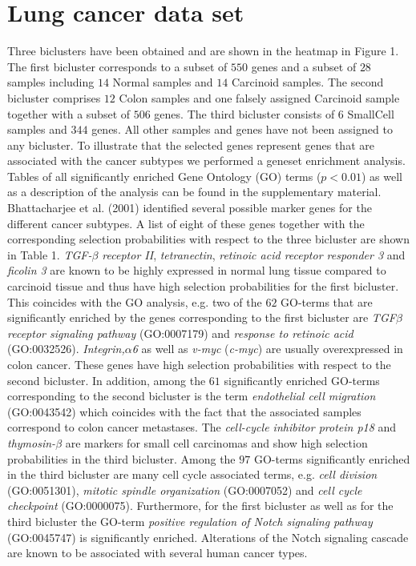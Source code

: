 \section{Lung cancer data set}
Three biclusters have been obtained and are shown in the heatmap in Figure 1. The first bicluster corresponds to a subset of $550$ genes and a subset of $28$ samples including $14$ Normal samples and $14$ Carcinoid samples. The second bicluster comprises $12$ Colon samples and one falsely assigned Carcinoid sample together with a subset of $506$ genes. The third bicluster consists of $6$ SmallCell samples and $344$ genes. All other samples and genes have not been assigned to any bicluster. To illustrate that the selected genes represent genes that are associated with the cancer subtypes we performed a geneset enrichment analysis. Tables of all significantly enriched Gene Ontology (GO) terms ($p<0.01$) as well as a description of the analysis can be found in the supplementary material. 
Bhattacharjee et al. (2001) identified several possible marker genes for the different cancer subtypes. A list of eight of these genes together with the corresponding selection probabilities with respect to the three bicluster are shown in Table 1. \textit{TGF-$\beta$ receptor II}, \textit{tetranectin}, \textit{retinoic acid receptor responder 3} and \textit{ficolin 3} are known to be highly expressed in normal lung tissue compared to carcinoid tissue and thus have high selection probabilities for the first bicluster. This coincides with the GO analysis, e.g. two of the $62$ GO-terms that are significantly enriched by the genes corresponding to the first bicluster are \textit{TGF$\beta$ receptor signaling pathway} (GO:0007179) and \textit{response to retinoic acid} (GO:0032526). \textit{Integrin,$\alpha$6} as well as \textit{v-myc} (\textit{c-myc}) are usually overexpressed in colon cancer. These genes have high selection probabilities with respect to the second bicluster. In addition, among the $61$ significantly enriched GO-terms corresponding to the second bicluster is the term \textit{endothelial cell migration} (GO:0043542) which coincides with the fact that the associated samples correspond to colon cancer metastases. The \textit{cell-cycle inhibitor protein p18} and \textit{thymosin-$\beta$} are markers for small cell carcinomas and show high selection probabilities in the third bicluster. Among the $97$ GO-terms significantly enriched in the third bicluster are many cell cycle associated terms, e.g. \textit{cell division} (GO:0051301), \textit{mitotic spindle organization} (GO:0007052) and \textit{cell cycle checkpoint} (GO:0000075). Furthermore, for the first bicluster as well as for the third bicluster the GO-term \textit{positive regulation of Notch signaling pathway} (GO:0045747) is significantly enriched. Alterations of the Notch signaling cascade are known to be associated with several human cancer types. 

